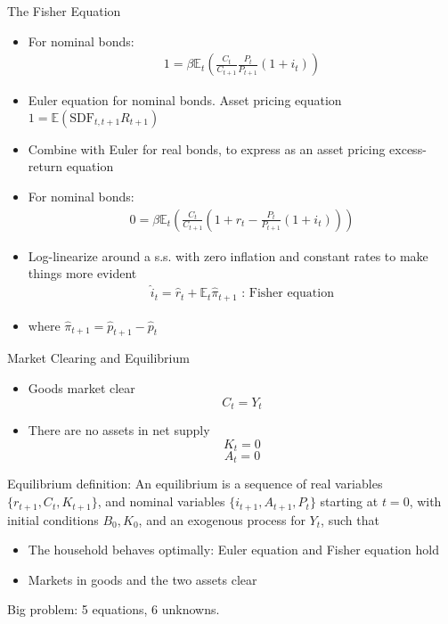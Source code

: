 \documentclass[11pt,aspectratio=169,xcolor={dvipsnames},hyperref={pdftex,pdfpagemode=UseNone,hidelinks,pdfdisplaydoctitle=true},usepdftitle=false]{beamer}
\begin{document}
\begin{frame}{The Fisher Equation}
\begin{itemize}
\item For nominal bonds:
\begin{align*}
1 = \beta \mathbb{E}_t \left(\frac{C_t}{C_{t+1}}\frac{P_t}{P_{t+1}}(1+i_t)\right)
\end{align*}
\item Euler equation for nominal bonds. Asset pricing equation $1 = \mathbb{E}(\text{SDF}_{t,t+1}R_{t+1})$
\item Combine with Euler for real bonds, to express as an asset pricing excess-return equation
\item For nominal bonds:
\begin{align*}
0 = \beta \mathbb{E}_t \left(\frac{C_t}{C_{t+1}}\left(1+r_t - \frac{P_t}{P_{t+1}}(1+i_t) \right)\right)
\end{align*}
\item Log-linearize around a s.s. with zero inflation and constant rates to make things more evident
\begin{align*}
\hat{i}_{t} = \hat{r}_t + \mathbb{E}_t \hat{\pi}_{t+1} \text{       : Fisher equation}
\end{align*}
\item where $\hat{\pi}_{t+1} = \hat{p}_{t+1} - \hat{p}_t$
\end{itemize}
\end{frame}


\begin{frame}{Market Clearing and Equilibrium}
\begin{itemize}
\item Goods market clear $$C_t = Y_t$$
\item There are no assets in net supply $$K_t = 0$$ $$A_t = 0$$
\end{itemize}
Equilibrium definition: An equilibrium is a sequence of real variables $\{r_{t+1},C_t,K_{t+1}\}$, and nominal variables $\{i_{t+1},A_{t+1},P_t\}$ starting at $t=0$, with initial conditions $B_0,K_0$, and an exogenous process for $Y_t$, such that
\begin{itemize}
\item The household behaves optimally: Euler equation and Fisher equation hold
\item Markets in goods and the two assets clear
\end{itemize}
Big problem: 5 equations, 6 unknowns.
\end{frame}
\end{document}
